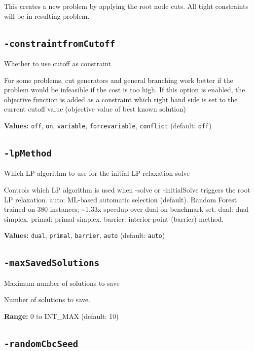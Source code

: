 \documentclass[11pt,a4paper]{article}
\begin{document}
This creates a new problem by applying the root node cuts. All tight constraints will be in resulting problem.

\subsection*{\texttt{-constraintfromCutoff}}

Whether to use cutoff as constraint

For some problems, cut generators and general branching work better if the problem would be infeasible if the cost is too high. If this option is enabled, the objective function is added as a constraint which right hand side is set to the current cutoff value (objective value of best known solution)

\textbf{Values:} \texttt{off}, \texttt{on}, \texttt{variable}, \texttt{forcevariable}, \texttt{conflict} (default: \texttt{off})

\subsection*{\texttt{-lpMethod}}

Which LP algorithm to use for the initial LP relaxation solve

Controls which LP algorithm is used when -solve or -initialSolve triggers the root LP relaxation.
  auto:    ML-based automatic selection (default). Random Forest trained
           on 380 instances; \textasciitilde{}1.33x speedup over dual on benchmark set.
  dual:    dual simplex.
  primal:  primal simplex.
  barrier: interior-point (barrier) method.

\textbf{Values:} \texttt{dual}, \texttt{primal}, \texttt{barrier}, \texttt{auto} (default: \texttt{auto})

\subsection*{\texttt{-maxSavedSolutions}}

Maximum number of solutions to save

Number of solutions to save.

\textbf{Range:} 0 to INT\_MAX (default: 10)

\subsection*{\texttt{-randomCbcSeed}}
\end{document}
